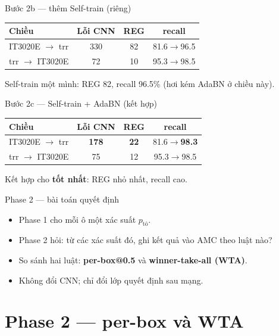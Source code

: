 \documentclass{beamer}
\newcommand{\hl}[1]{\textbf{#1}}
\begin{document}
\begin{frame}{Bước 2b --- thêm Self-train (riêng)}
\begin{center}
\begin{tabular}{|l|c|c|c|}
\hline
\textbf{Chiều} & \textbf{Lỗi CNN} & \textbf{REG} & \textbf{recall} \\
\hline
IT3020E $\to$ trr & 330 & 82 & 81.6$\to$96.5 \\
\hline
trr $\to$ IT3020E & 72 & 10 & 95.3$\to$98.5 \\
\hline
\end{tabular}
\end{center}
\vspace{0.2cm}
Self-train một mình: REG 82, recall 96.5\% (hơi kém AdaBN ở chiều này).
\end{frame}

\begin{frame}{Bước 2c --- Self-train + AdaBN (kết hợp)}
\begin{center}
\begin{tabular}{|l|c|c|c|}
\hline
\textbf{Chiều} & \textbf{Lỗi CNN} & \textbf{REG} & \textbf{recall} \\
\hline
IT3020E $\to$ trr & \hl{178} & \hl{22} & 81.6$\to$\hl{98.3} \\
\hline
trr $\to$ IT3020E & 75 & 12 & 95.3$\to$98.5 \\
\hline
\end{tabular}
\end{center}
\vspace{0.2cm}
Kết hợp cho \hl{tốt nhất}: REG nhỏ nhất, recall cao.
\end{frame}

\begin{frame}{Phase 2 --- bài toán quyết định}
\begin{itemize}
    \item Phase 1 cho mỗi ô một xác suất $p_{\text{tô}}$.
    \item Phase 2 hỏi: từ các xác suất đó, ghi kết quả vào AMC theo luật nào?
    \item So sánh hai luật: \hl{per-box@0.5} và \hl{winner-take-all (WTA)}.
    \item Không đổi CNN; chỉ đổi lớp quyết định sau mạng.
\end{itemize}
\vspace{0.2cm}
\end{frame}

\section{Phase 2 --- per-box và WTA}
\end{document}
